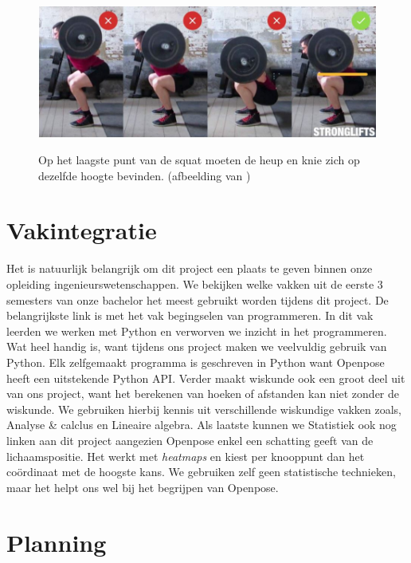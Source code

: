\documentclass[a4paper,twoside,kulak]{kulakreport}
\begin{document}
\begin{figure}[H]
	\includegraphics[width= \textwidth]{squat_heup}
	\label{squat_heup}
	\caption{Op het laagste punt van de squat moeten de heup en knie zich op dezelfde hoogte bevinden. (afbeelding van \cite{squats})}
\end{figure}
 
\chapter{Vakintegratie}
Het is natuurlijk belangrijk om dit project een plaats te geven binnen onze opleiding ingenieurswetenschappen. We bekijken welke vakken uit de eerste 3 semesters van onze bachelor het meest gebruikt worden tijdens dit project. De belangrijkste link is met het vak begingselen van programmeren. In dit vak leerden we werken met Python en verworven we inzicht in het programmeren. Wat heel handig is, want tijdens ons project maken we veelvuldig gebruik van Python. Elk zelfgemaakt programma is geschreven in Python want Openpose heeft een uitstekende Python API. Verder maakt wiskunde ook een groot deel uit van ons project, want het berekenen van hoeken of afstanden kan niet zonder de wiskunde. We gebruiken hierbij kennis uit verschillende wiskundige vakken zoals, Analyse \& calclus en Lineaire algebra. Als laatste kunnen we Statistiek ook nog linken aan dit project aangezien Openpose enkel een schatting geeft van de lichaamspositie. Het werkt met \textit{heatmaps} en kiest per knooppunt dan het coördinaat met de hoogste kans. We gebruiken zelf geen statistische technieken, maar het helpt ons wel bij het begrijpen van Openpose.

\chapter{Planning}
\end{document}
